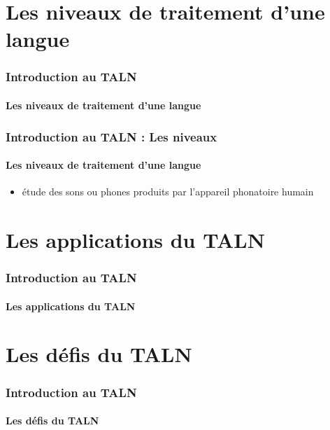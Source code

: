 \documentclass{beamer}
\begin{document}
\section{Les niveaux de traitement d'une langue}

\begin{frame}
\frametitle{Introduction au TALN}
\framesubtitle{Les niveaux de traitement d'une langue}


\end{frame}

\begin{frame}
\frametitle{Introduction au TALN : Les niveaux}
\framesubtitle{Les niveaux de traitement d'une langue}

\begin{itemize}
	\item étude des sons ou phones produits par l'appareil phonatoire humain
\end{itemize}

\end{frame}

\section{Les applications du TALN}

\begin{frame}
\frametitle{Introduction au TALN}
\framesubtitle{Les applications du TALN}

\end{frame}

\section{Les défis du TALN}

\begin{frame}
\frametitle{Introduction au TALN}
\framesubtitle{Les défis du TALN}

\end{frame}



\end{document}

